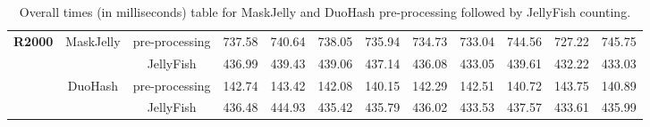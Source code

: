 \begin{sidewaystable}
\begin{tabular}{ccc | rrrrrrrrr}
		\multirow{4}{*}{\textbf{R2000}}
		& \multirow{2}{*}{MaskJelly} & pre-processing & 737.58 & 740.64 & 738.05 & 735.94 & 734.73 & 733.04 & 744.56 & 727.22 & 745.75 \\
		& & JellyFish & 436.99 & 439.43 & 439.06 & 437.14 & 436.08 & 433.05 & 439.61 & 432.22 & 433.03 \\
		\cmidrule{2-12}
		& \multirow{2}{*}{DuoHash} & pre-processing & 142.74 & 143.42 & 142.08 & 140.15 & 142.29 & 142.51 & 140.72 & 143.75 & 140.89 \\
		& & JellyFish & 436.48 & 444.93 & 435.42 & 435.79 & 436.02 & 433.53 & 437.57 & 433.61 & 435.99 \\
		
		\bottomrule
	\end{tabular}
	\caption[Overall times table for MaskJelly and DuoHash pre-processing.]{Overall times (in milliseconds) table for MaskJelly and DuoHash pre-processing followed by JellyFish counting.}
	\label{tab:time-maskjelly-duohash}
\end{sidewaystable}


